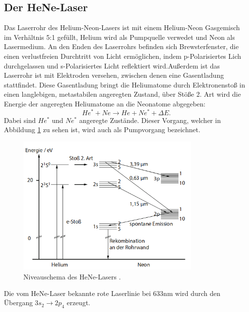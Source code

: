 \subsection{Der HeNe-Laser}
Das Laserrohr des Helium-Neon-Lasers ist mit einem Helium-Neon Gasgemisch im Verhältnis 5:1 gefüllt,
Helium wird als Pumpquelle verwedet und Neon als Lasermedium. An den Enden des Laserrohrs befinden sich
Brewsterfenster, die einen verlustfreien Durchtritt von Licht ermöglichen, indem p-Polarisiertes Lich
durchgelassen und s-Polarisiertes Licht reflektiert wird.Außerdem ist das Laserrohr ist mit Elektroden versehen,
zwischen denen eine Gasentladung stattfindet. Diese Gasentladung bringt die Heliumatome durch Elektronenstoß in einen
langlebigen, metastabilen angeregten Zustand, über Stöße 2. Art wird die Energie der angeregten Heliumatome an die
Neonatome abgegeben:
\begin{equation}
  He^* + Ne \rightarrow He + Ne^* + \Delta E.
\end{equation}
Dabei sind $He^*$ und $Ne^*$ angeregte Zustände. Dieser Vorgang, welcher in Abbildung \ref{fig:entladung} zu sehen ist,
wird auch als Pumpvorgang bezeichnet.

\begin{figure}[H]
  \centering
  \includegraphics[height=7cm]{Entladung.png}
  \caption{Niveauschema des HeNe-Lasers \cite{Springer2}.}
  \label{fig:entladung}
\end{figure}

Die vom HeNe-Laser bekannte rote Laserlinie bei 633\;nm wird durch den Übergang $3s_2 \rightarrow 2p_4$
erzeugt.

